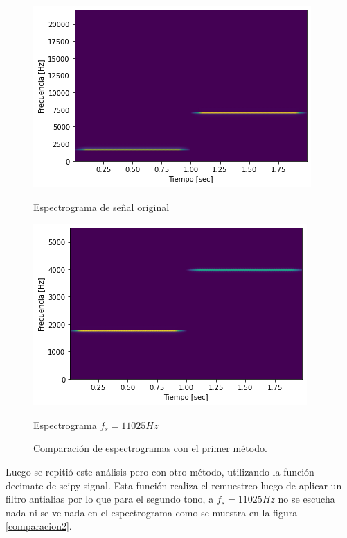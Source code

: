 \documentclass[a4paper]{article}
\begin{document}
\begin{figure}[h]
\begin{minipage}[b]{0.5\linewidth}
\centering
\includegraphics[width=\linewidth]{original_tones.png}
\caption{Espectrograma de señal original}
\label{f:figura1}
\end{minipage}
\hspace{0.5cm}
\begin{minipage}[b]{0.5\linewidth}
\centering
\includegraphics[width=\linewidth]{4_tones.png}
\caption{Espectrograma $f_s = 11025Hz$}
\label{f:figura2}
\end{minipage}
\caption{Comparación de espectrogramas con el primer método.}
\label{comparacion1}
\end{figure}
\newline
Luego se repitió este análisis pero con otro método, utilizando la función decimate de scipy signal. Esta función realiza el remuestreo luego de aplicar un filtro antialias por lo que para el segundo tono, a $f_s = 11025Hz$ no se escucha nada ni se ve nada en el espectrograma como se muestra en la figura \ref{comparacion2}.
\end{document}
